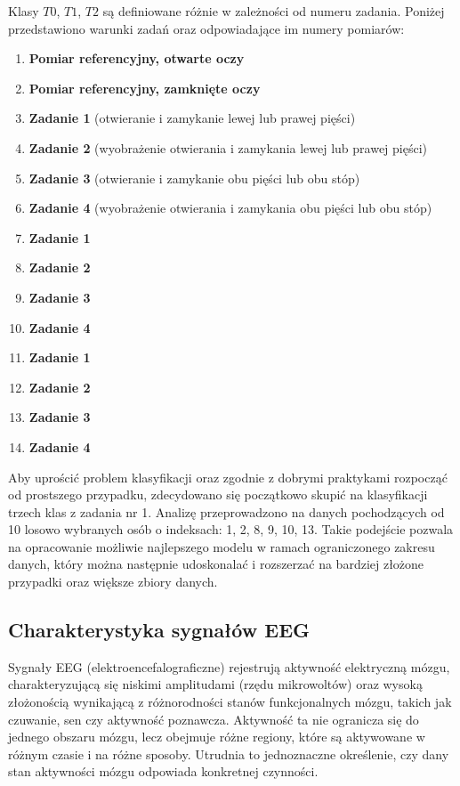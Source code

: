 \documentclass[eeg_v4.tex]{subfiles}
\begin{document}
    Klasy $T0$, $T1$, $T2$
    są definiowane różnie w zależności od numeru zadania. Poniżej przedstawiono warunki zadań oraz odpowiadające im
    numery pomiarów:

    \begin{enumerate}
        \item \textbf{Pomiar referencyjny, otwarte oczy}
        \item \textbf{Pomiar referencyjny, zamknięte oczy}
        \item \textbf{Zadanie 1} (otwieranie i zamykanie lewej lub prawej pięści)
        \item \textbf{Zadanie 2} (wyobrażenie otwierania i zamykania lewej lub prawej pięści)
        \item \textbf{Zadanie 3} (otwieranie i zamykanie obu pięści lub obu stóp)
        \item \textbf{Zadanie 4} (wyobrażenie otwierania i zamykania obu pięści lub obu stóp)
        \item \textbf{Zadanie 1}
        \item \textbf{Zadanie 2}
        \item \textbf{Zadanie 3}
        \item \textbf{Zadanie 4}
        \item \textbf{Zadanie 1}
        \item \textbf{Zadanie 2}
        \item \textbf{Zadanie 3}
        \item \textbf{Zadanie 4}
    \end{enumerate}

    Aby uprościć problem klasyfikacji oraz zgodnie z dobrymi praktykami rozpocząć od prostszego przypadku, zdecydowano
    się początkowo skupić na klasyfikacji trzech klas z zadania nr 1. Analizę przeprowadzono na danych pochodzących
    od 10 losowo wybranych osób o indeksach: {1, 2, 8, 9, 10, 13}. Takie podejście pozwala na opracowanie możliwie
    najlepszego modelu w ramach ograniczonego zakresu danych, który można następnie udoskonalać i rozszerzać na bardziej
    złożone przypadki oraz większe zbiory danych.

    \subsection{Charakterystyka sygnałów EEG}

    Sygnały EEG (elektroencefalograficzne) rejestrują aktywność elektryczną mózgu, charakteryzującą się niskimi
    amplitudami (rzędu mikrowoltów) oraz wysoką złożonością wynikającą z różnorodności stanów funkcjonalnych mózgu,
    takich jak czuwanie, sen czy aktywność poznawcza. Aktywność ta nie ogranicza się do jednego obszaru mózgu, lecz
    obejmuje różne regiony, które są aktywowane w różnym czasie i na różne sposoby. Utrudnia to jednoznaczne określenie,
    czy dany stan aktywności mózgu odpowiada konkretnej czynności.
\end{document}
